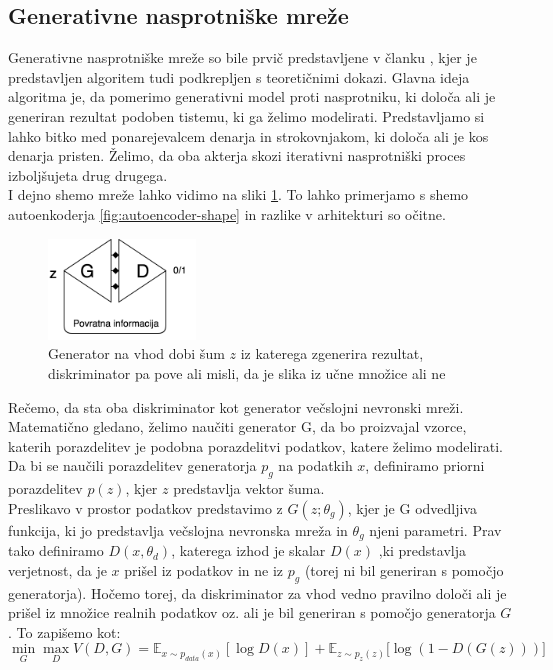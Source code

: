 \documentclass[12pt,a4paper,twoside]{article}
\theoremstyle{definition} %
\theoremstyle{plain} %
\numberwithin{equation}{section}  %
\begin{document}
\subsection{Generativne nasprotniške mreže}
Generativne nasprotniške mreže so bile prvič predstavljene v članku  \cite{gangoodfellow}, kjer je predstavljen algoritem tudi podkrepljen s teoretičnimi
dokazi. Glavna ideja algoritma je, da pomerimo generativni model proti nasprotniku, ki določa ali je generiran rezultat podoben tistemu, ki ga želimo modelirati. 
Predstavljamo si lahko bitko med ponarejevalcem denarja in strokovnjakom, ki določa ali je kos denarja pristen. Želimo, da oba akterja skozi iterativni nasprotniški proces izboljšujeta drug drugega. \\ I
dejno shemo  mreže lahko vidimo na sliki \ref{fig:gan-diagram}. To lahko primerjamo s shemo autoenkoderja  \ref{fig:autoencoder-shape} in razlike v arhitekturi so očitne. 
\begin{figure}[ht]
  \centering
  \includegraphics[width=0.35\textwidth]{images/gan_schema.png}
 \caption[Diagram strukture autoenkoderja ]{Generator na vhod dobi šum $z$ iz katerega zgenerira rezultat, diskriminator pa pove ali misli, da je slika iz učne množice ali ne}
  \label{fig:gan-diagram}
\end{figure}


Rečemo, da sta oba  diskriminator kot generator večslojni nevronski mreži. Matematično gledano, želimo naučiti generator G, da bo proizvajal vzorce, katerih porazdelitev je podobna porazdelitvi podatkov, katere želimo modelirati. Da bi se naučili porazdelitev generatorja $p_g$ na podatkih $x$, definiramo priorni porazdelitev $p(z)$, kjer $z$ predstavlja vektor šuma.\\ Preslikavo v prostor podatkov predstavimo z $G(z;\theta_g)$, kjer je G odvedljiva funkcija, ki jo predstavlja večslojna nevronska mreža in $\theta_g$ njeni parametri.  Prav tako definiramo $D(x,\theta_d)$, katerega izhod je skalar $D(x)$ ,ki predstavlja verjetnost, da je $x$ prišel iz podatkov in ne iz  $p_g$ (torej ni bil generiran s pomočjo generatorja). Hočemo torej, da diskriminator za vhod vedno pravilno določi ali je prišel iz množice realnih podatkov oz. ali je bil generiran s pomočjo generatorja $G$. To zapišemo kot: 
\begin{equation}
\label{eq:gan-main}
 \min_G\max_DV(D,G) = \mathbb{E}_{x \sim p_{data}(x)}[\log{D(x)}] + \mathbb{E}_{z \sim p_z(z)}[\log{(1-D(G(z)))]} 
\end{equation}
\end{document}
